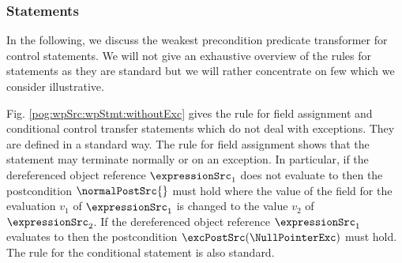 
\subsubsection{Statements}\label{pog:wpSrc:wpStmt}

In the following, we discuss  the weakest precondition predicate transformer for  control statements.
 We will not give an exhaustive overview of the \wpName{} rules for statements as they are standard 
but we will rather  concentrate on few which we consider illustrative. 

Fig. \ref{pog:wpSrc:wpStmt:withoutExc} gives  the rule for  field assignment and conditional control transfer
statements which do not deal with exceptions. They are defined in a standard way. 
The rule for field assignment shows that the statement may terminate normally or on an exception. 
In particular, if the  dereferenced object reference $\expressionSrc_1$ does not evaluate to \Mynull{} 
 then  the postcondition $\normalPostSrc{}$ must hold where the value of the field \fieldd{} for the 
evaluation $v_1$ of $\expressionSrc_1$ is changed to the value  $v_2$ of  $\expressionSrc_2$.
If  the  dereferenced object reference $\expressionSrc_1$  evaluates to \Mynull{} then the postcondition 
$ \excPostSrc(\NullPointerExc) $ must hold.
The rule for the conditional statement is also standard.
 
